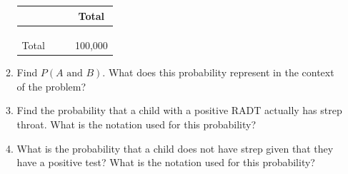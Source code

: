 \documentclass[
]{report}
\begin{document}
\begin{enumerate}
\begin{enumerate}
    \begin{center}
     \renewcommand{\arraystretch}{1.5}
     \begin{tabular}{cccc} \hline
     \hspace{1in} & \hspace{1in} & \hspace{1in} & Total \\ \hline
     & & & \\ 
     & & & \\ 
     & & & \\ \hline
     Total & & & 100,000 \\ \hline
     \end{tabular}
     \end{center}
    \vspace{.1in}
  \item
    Find \(P(A \mbox{ and } B)\). What does this probability represent in the context of the problem?
    \vspace{.8in}
  \item
    Find the probability that a child with a positive RADT actually has strep throat. What is the notation used for this probability?
    \vspace{.8in}
  \item
    What is the probability that a child does not have strep given that they have a positive test? What is the notation used for this probability?
  \end{enumerate}
\end{enumerate}

\newpage
\end{document}
